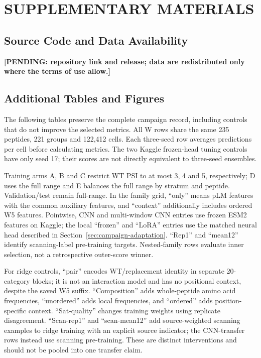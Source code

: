 \chapter{SUPPLEMENTARY MATERIALS}\label{app:supplementary}

\section{Source Code and Data Availability}
\textbf{[PENDING: repository link and release; data are redistributed only where the terms of use allow.]}

\section{Additional Tables and Figures}
The following tables preserve the complete campaign record, including controls that do not improve
the selected metrics. All W rows share the same 235 peptides, 221 groups and 122,412 cells. Each
three-seed row averages predictions per cell before calculating metrics. The two Kaggle frozen-head
tuning controls have only seed 17; their scores are not directly equivalent to three-seed ensembles.

Training arms A, B and C restrict WT PSI to at most 3, 4 and 5, respectively; D uses the full range
and E balances the full range by stratum and peptide. Validation/test remain full-range. In the family
grid, ``only'' means pLM features with the common auxiliary features, and ``context'' additionally
includes ordered W5 features. Pointwise, CNN and multi-window CNN entries use frozen ESM2 features
on Kaggle; the local ``frozen'' and ``LoRA'' entries use the matched neural head described in
Section~\ref{sec:campaign-adaptation}. ``Rep1'' and ``mean12'' identify scanning-label pre-training
targets. Nested-family rows evaluate inner selection, not a retrospective outer-score winner.

For ridge controls, ``pair'' encodes WT/replacement identity in separate 20-category blocks;
it is not an interaction model and has no positional context, despite the saved W5 suffix.
``Composition'' adds whole-peptide amino acid frequencies, ``unordered'' adds local frequencies,
and ``ordered'' adds position-specific context. ``Sat-quality'' changes training weights using
replicate disagreement. ``Scan-rep1'' and ``scan-mean12'' add source-weighted scanning examples
to ridge training with an explicit source indicator; the CNN-transfer rows instead use scanning
pre-training. These are distinct interventions and should not be pooled into one transfer claim.

